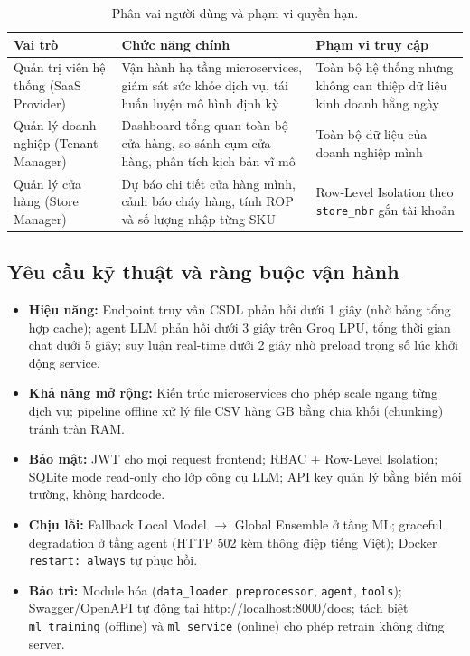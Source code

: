 \documentclass[12pt,a4paper]{report}
\begin{document}
\newpage
\begin{table}[H]
\centering
\begin{tabular}{@{}lp{5cm}p{5cm}@{}}
\toprule
\textbf{Vai trò} & \textbf{Chức năng chính} & \textbf{Phạm vi truy cập} \\
\midrule
Quản trị viên hệ thống (SaaS Provider) & Vận hành hạ tầng microservices, giám sát sức khỏe dịch vụ, tái huấn luyện mô hình định kỳ & Toàn bộ hệ thống nhưng không can thiệp dữ liệu kinh doanh hằng ngày \\
\addlinespace
Quản lý doanh nghiệp (Tenant Manager) & Dashboard tổng quan toàn bộ cửa hàng, so sánh cụm cửa hàng, phân tích kịch bản vĩ mô & Toàn bộ dữ liệu của doanh nghiệp mình \\
\addlinespace
Quản lý cửa hàng (Store Manager) & Dự báo chi tiết cửa hàng mình, cảnh báo cháy hàng, tính ROP và số lượng nhập từng SKU & Row-Level Isolation theo \texttt{store\_nbr} gắn tài khoản \\
\bottomrule
\end{tabular}
\caption{Phân vai người dùng và phạm vi quyền hạn.}
\end{table}







\subsection{Yêu cầu kỹ thuật và ràng buộc vận hành}
\begin{itemize}
    \item \textbf{Hiệu năng:} Endpoint truy vấn CSDL phản hồi dưới 1 giây (nhờ bảng tổng hợp cache); agent LLM phản hồi dưới 3 giây trên Groq LPU, tổng thời gian chat dưới 5 giây; suy luận real-time dưới 2 giây nhờ preload trọng số lúc khởi động service.
    
    \item \textbf{Khả năng mở rộng:} Kiến trúc microservices cho phép scale ngang từng dịch vụ; pipeline offline xử lý file CSV hàng GB bằng chia khối (chunking) tránh tràn RAM.
    
    \item \textbf{Bảo mật:} JWT cho mọi request frontend; RBAC + Row-Level Isolation; SQLite mode read-only cho lớp công cụ LLM; API key quản lý bằng biến môi trường, không hardcode.
    
    \item \textbf{Chịu lỗi:} Fallback Local Model $\rightarrow$ Global Ensemble ở tầng ML; graceful degradation ở tầng agent (HTTP 502 kèm thông điệp tiếng Việt); Docker \texttt{restart: always} tự phục hồi.
    
    \item \textbf{Bảo trì:} Module hóa (\texttt{data\_loader}, \texttt{preprocessor}, \texttt{agent}, \texttt{tools}); Swagger/OpenAPI tự động tại \url{http://localhost:8000/docs}; tách biệt \texttt{ml\_training} (offline) và \texttt{ml\_service} (online) cho phép retrain không dừng server.
\end{itemize}
\end{document}
